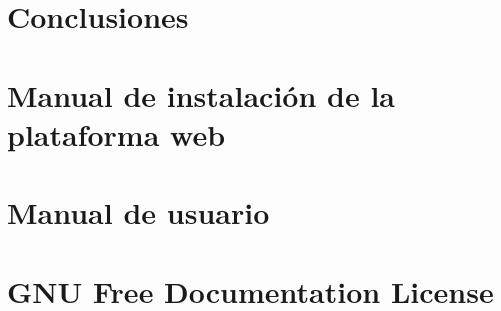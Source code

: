 \documentclass[a4paper, 12pt]{book}
\begin{document}
\chapter{Conclusiones}
\label{chap:conclusiones}


\appendix

\chapter{Manual de instalación de la plataforma web}
\label{chap:manual_instalacion}


\chapter{Manual de usuario}
\label{chap:manual_usuario}


\chapter{GNU Free Documentation License}
\label{sec:fdl}




\end{document}
